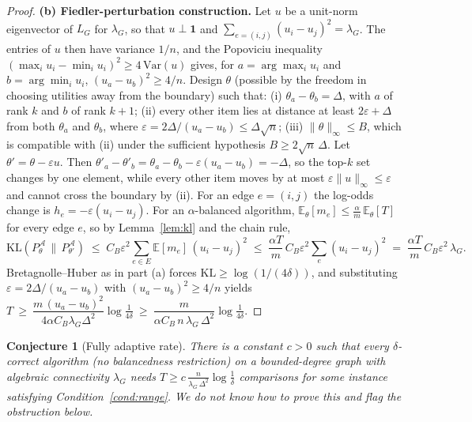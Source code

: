 \documentclass[11pt]{article}
\newtheorem{conjecture}[theorem]{Conjecture}
\theoremstyle{definition}
\newcommand{\E}{\mathbb{E}}
\newcommand{\KL}{\mathrm{KL}}
\newcommand{\lG}{\lambda_G}
\begin{document}
\begin{proof}
\textbf{(b) Fiedler-perturbation construction.}  Let $u$ be a unit-norm eigenvector of $L_G$ for $\lG$, so that $u\perp\mathbf 1$ and $\sum_{e=(i,j)}(u_i-u_j)^2=\lG$.  The entries of $u$ then have variance $1/n$, and the Popoviciu inequality $(\max_i u_i-\min_i u_i)^2\ge 4\,\mathrm{Var}(u)$ gives, for $a=\arg\max_i u_i$ and $b=\arg\min_i u_i$, $(u_a-u_b)^2\ge 4/n$.  Design $\theta$ (possible by the freedom in choosing utilities away from the boundary) such that: (i) $\theta_a-\theta_b=\Delta$, with $a$ of rank $k$ and $b$ of rank $k+1$; (ii) every other item lies at distance at least $2\varepsilon+\Delta$ from both $\theta_a$ and $\theta_b$, where $\varepsilon=2\Delta/(u_a-u_b)\le \Delta\sqrt n$; (iii) $\|\theta\|_\infty\le B$, which is compatible with (ii) under the sufficient hypothesis $B\ge 2\sqrt n\,\Delta$.  Let $\theta'=\theta-\varepsilon u$.  Then $\theta'_a-\theta'_b=\theta_a-\theta_b-\varepsilon(u_a-u_b)=-\Delta$, so the top-$k$ set changes by one element, while every other item moves by at most $\varepsilon\|u\|_\infty\le\varepsilon$ and cannot cross the boundary by (ii).  For an edge $e=(i,j)$ the log-odds change is $h_e=-\varepsilon(u_i-u_j)$.  For an $\alpha$-balanced algorithm, $\E_\theta[m_e]\le \frac{\alpha}{m}\,\E_\theta[T]$ for every edge $e$, so by Lemma~\ref{lem:kl} and the chain rule,
\[
\KL\!\left(P_\theta^{\mathcal A}\,\Big\|\,P_{\theta'}^{\mathcal A}\right)
\;\le\; C_B\varepsilon^2\sum_{e\in E}\E[m_e]\,(u_i-u_j)^2
\;\le\; \frac{\alpha T}{m}\,C_B\varepsilon^2\sum_{e}(u_i-u_j)^2
\;=\; \frac{\alpha T}{m}\,C_B\varepsilon^2\,\lG .
\]
Bretagnolle--Huber as in part (a) forces $\KL\ge\log(1/(4\delta))$, and substituting $\varepsilon=2\Delta/(u_a-u_b)$ with $(u_a-u_b)^2\ge 4/n$ yields
$T\ \ge\ \dfrac{m\,(u_a-u_b)^2}{4\alpha C_B\lG\Delta^2}\log\frac1{4\delta}\ \ge\ \dfrac{m}{\alpha C_B\,n\,\lG\,\Delta^2}\log\frac1{4\delta}$.
\end{proof}

\begin{conjecture}[Fully adaptive rate]
\label{conj:adaptive}
There is a constant $c>0$ such that every $\delta$-correct algorithm (no balancedness restriction) on a bounded-degree graph with algebraic connectivity $\lG$ needs $T\ge c\,\frac{n}{\lG\,\Delta^2}\log\frac1\delta$ comparisons for some instance satisfying Condition~\ref{cond:range}.  We do not know how to prove this and flag the obstruction below.
\end{conjecture}
\end{document}
